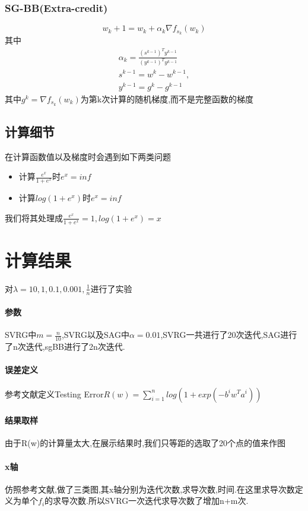 \documentclass[UTF8]{ctexart}
\begin{document}
\subsubsection{SG-BB(Extra-credit)}
  $$
  w_k+1= w_k + \alpha_k \nabla f_{s_k}(w_k)
$$
其中
\begin{equation*}
\begin{split}
\alpha_k = \frac{(s^{k-1})^Ty^{k-1}}{(y^{k-1})^Ty^{k-1}} \\
s^{k-1}=w^k-w^{k-1},\\
 y^{k-1}=g^k-g^{k-1}
\end{split}
\end{equation*}
其中$g^k=\nabla f_{s_k}(w_k)$为第k次计算的随机梯度,而不是完整函数的梯度
\subsection{计算细节}
在计算函数值以及梯度时会遇到如下两类问题
\begin{itemize}
  \item 计算$\frac{e^x}{1+e^x}$时$e^x=inf$
  \item 计算$log(1+e^x)$时$e^x=inf$
\end{itemize}
我们将其处理成$\frac{e^x}{1+e^x}=1,log(1+e^x)=x$
\section{计算结果}

对$\lambda=10,1,0.1,0.001,\frac{1}{n}$进行了实验
\paragraph{参数}
SVRG中$m=\frac{n}{10}$,SVRG以及SAG中$\alpha=0.01$,SVRG一共进行了20次迭代,SAG进行了n次迭代,sgBB进行了2n次迭代.
\paragraph{误差定义}
参考文献定义Testing Error$R(w)=\sum_{i=1}^{n}log(1+exp(-b^iw^Ta^i))$
\paragraph{结果取样}
由于R(w)的计算量太大,在展示结果时,我们只等距的选取了20个点的值来作图
\paragraph{x轴}
仿照参考文献,做了三类图,其x轴分别为迭代次数,求导次数,时间.在这里求导次数定义为单个$f_i$的求导次数.所以SVRG一次迭代求导次数了增加n+m次.
\end{document}
